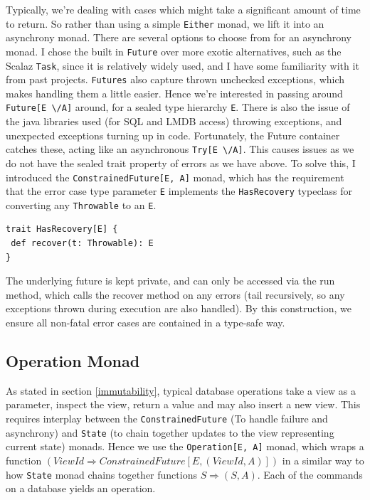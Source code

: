 \documentclass[12pt,a4paper,twoside,openright]{report}
\newcommand\codeName[1]{\texttt{#1}}
\newcommand\either[0]{\textbackslash/}
\renewcommand{\baselinestretch}{1.1}    %
\begin{document}
Typically, we're dealing with cases which might take a significant amount of time to return. So rather than using a simple \codeName{Either} monad, we lift it into an asynchrony monad. There are several options to choose from for an asynchrony monad. I chose the built in \codeName{Future} over more exotic alternatives, such as the Scalaz \codeName{Task}, since it is relatively widely used, and I have some familiarity with it from past projects. \codeName{Futures} also capture thrown unchecked exceptions, which makes handling them a little easier. Hence we're interested in passing around \codeName{Future[E \either A]} around, for a sealed type hierarchy \codeName{E}. There is also the issue of the java libraries used (for SQL and LMDB access) throwing exceptions, and unexpected exceptions turning up in code. Fortunately, the  Future container catches these, acting like an asynchronous \codeName{Try[E \either A]}. This causes issues as we do not have the sealed trait property of errors as we have above. To solve this, I introduced the \codeName{ConstrainedFuture[E, A]} monad, which has the requirement that the error case type parameter \codeName{E} implements the \codeName{HasRecovery} typeclass for converting any \codeName{Throwable} to an \codeName{E}.

\renewcommand{\baselinestretch}{0.8}
\begin{framed}
	\begin{verbatim}
trait HasRecovery[E] {
 def recover(t: Throwable): E
}
	\end{verbatim}
\end{framed}
\renewcommand{\baselinestretch}{1.1}

The underlying future is kept private, and can only be accessed via the run method, which calls the recover method on any errors (tail recursively, so any exceptions thrown during execution are also handled). By this construction, we ensure all non-fatal error cases are contained in a type-safe way.

	\subsection{Operation Monad}
	As stated in section \ref{immutability}, typical database operations take a view as a parameter, inspect the view, return a value and may also insert a new view. This requires interplay between the \codeName{ConstrainedFuture} (To handle failure and asynchrony) and \codeName{State} (to chain together updates to the view representing current state) monads. Hence we use the \codeName{Operation[E, A]} monad, which wraps a function \codeName{$(ViewId \Rightarrow ConstrainedFuture[E, (ViewId, A)])$} in a similar way to how \codeName{State} monad chains together functions \codeName{$S \Rightarrow (S, A)$}. Each of the commands on a database yields an operation.
\end{document}
